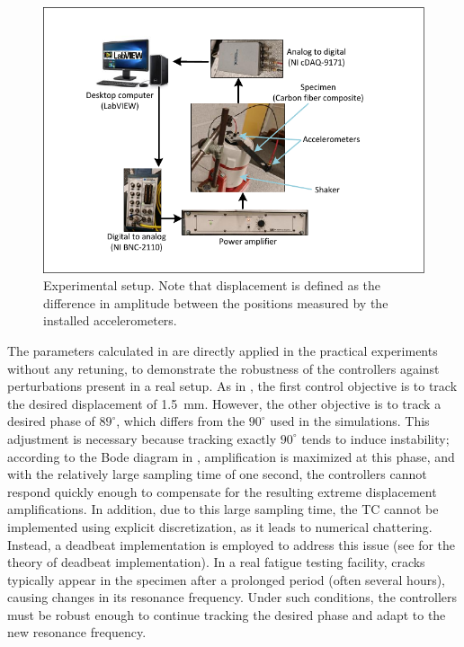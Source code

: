 \documentclass[lettersize,journal]{IEEEtran}
\begin{document}
\begin{figure}
    \centering    \includegraphics[width=\linewidth]{F_experiments.pdf}
    \caption{Experimental setup. Note that displacement is defined as the difference in amplitude between the positions measured by the installed accelerometers.
    }
    \label{F_setup}
\end{figure}

The parameters calculated in  are directly applied in the practical experiments without any retuning, to demonstrate the robustness of the controllers against perturbations present in a real setup. As in , the first control objective is to track the desired displacement of 1.5~mm. However, the other objective is to track a desired phase of $89^\circ$, which differs from the $90^\circ$ used in the simulations. This adjustment is necessary because tracking exactly $90^\circ$ tends to induce instability; according to the Bode diagram in , amplification is maximized at this phase, and with the relatively large sampling time of one second, the controllers cannot respond quickly enough to compensate for the resulting extreme displacement amplifications. In addition, due to this large sampling time, the TC cannot be implemented using explicit discretization, as it leads to numerical chattering. Instead, a deadbeat implementation is employed to address this issue (see  for the theory of deadbeat implementation). In a real fatigue testing facility, cracks typically appear in the specimen after a prolonged period (often several hours), causing changes in its resonance frequency. Under such conditions, the controllers must be robust enough to continue tracking the desired phase and adapt to the new resonance frequency.
\end{document}
